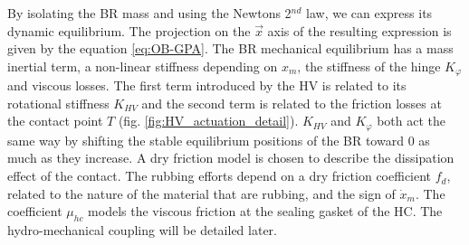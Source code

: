 \documentclass[3p,twocolumn,preprint]{elsarticle}
\begin{document}
By isolating the BR mass and using the Newtons 2$^{nd}$ law, we can express its dynamic equilibrium. The projection on the $\vec{x}$ axis of the resulting expression is given by the equation \ref{eq:OB-GPA}. The BR mechanical equilibrium has a mass inertial term, a non-linear stiffness depending on $x_m$, the stiffness of the hinge $K_{\varphi}$ and viscous losses. The first term introduced by the HV is related to its rotational stiffness $K_{HV}$ and the second term is related to the friction losses at the contact point $T$ (fig. \ref{fig:HV_actuation_detail}). $K_{HV}$ and $K_{\varphi}$ both act the same way by shifting the stable equilibrium positions of the BR toward $0$ as much as they increase. A dry friction model is chosen to describe the dissipation effect of the contact. The rubbing efforts depend on a dry friction coefficient $f_d$, related to the nature of the material that are rubbing, and the sign of $\dot{x}_m$. The coefficient $\mu_{hc}$ models the viscous friction at the sealing gasket of the HC. The hydro-mechanical coupling will be detailed later.
\end{document}
